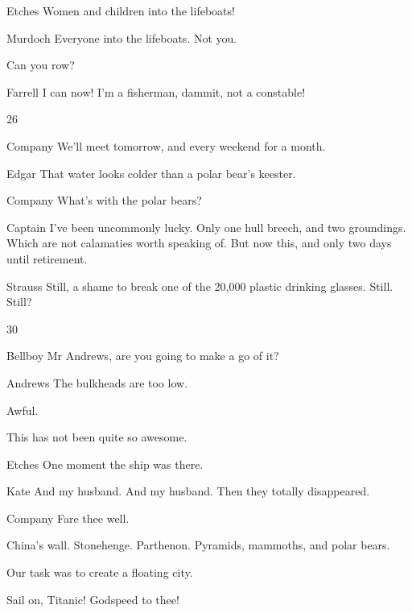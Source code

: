 \documentclass{screenplay}
\newcommand{\andrews}[1]{\begin{dialogue}{Andrews}#1\end{dialogue}}
\newcommand{\bellboy}[1]{\begin{dialogue}{Bellboy}#1\end{dialogue}}
\newcommand{\captain}[1]{\begin{dialogue}{Captain}#1\end{dialogue}}
\newcommand{\edgar}[1]{\begin{dialogue}{Edgar}#1\end{dialogue}}
\newcommand{\etches}[1]{\begin{dialogue}{Etches}#1\end{dialogue}}
\newcommand{\farrell}[1]{\begin{dialogue}{Farrell}#1\end{dialogue}}
\newcommand{\kate}[1]{\begin{dialogue}{Kate}#1\end{dialogue}}
\newcommand{\murdoch}[1]{\begin{dialogue}{Murdoch}#1\end{dialogue}}
\newcommand{\strauss}[1]{\begin{dialogue}{Strauss}#1\end{dialogue}}
\newcommand{\company}[1]{\begin{dialogue}{Company}#1\end{dialogue}}
\begin{document}
\etches{
    Women and children into the lifeboats!
}

\murdoch{
    Everyone into the lifeboats.
    Not you.

    Can you row?
}

\farrell{
    I can now!  I'm a fisherman, dammit, not a constable!
}

26

\company{
    We'll meet tomorrow, and every weekend for a month.
}

\edgar{
    That water looks colder than a polar bear's keester.
}

\company{
    What's with the polar bears?
}


\captain{
    I've been uncommonly lucky. Only one hull breech, and two groundings.
    Which are not calamaties worth speaking of.
    But now this, and only two days until retirement.
}


\strauss{
    Still, a shame to break one of the 20,000 plastic drinking glasses.
    Still.
    Still?
}


30

\bellboy{
    Mr Andrews, are you going to make a go of it?
}

\andrews{
    The bulkheads are too low.

    Awful.

    This has not been quite so awesome.
}


\etches{
    One moment the ship was there.
}

\kate{
    And my husband.
    And my husband.
    Then they totally disappeared.
}

\company{
    Fare thee well.

    China's wall.  Stonehenge.  Parthenon.  Pyramids, mammoths, and polar bears.
    
    Our task was to create a floating city.

    Sail on, Titanic!
    Godspeed to thee!
}

\theend
\end{document}
